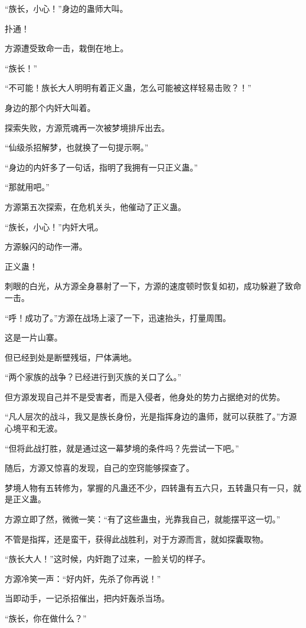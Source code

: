 \begin{this_body}
“族长，小心！”身边的蛊师大叫。

扑通！

方源遭受致命一击，栽倒在地上。

“族长！”

“不可能！族长大人明明有着正义蛊，怎么可能被这样轻易击败？！”

身边的那个内奸大叫着。

探索失败，方源荒魂再一次被梦境排斥出去。

“仙级杀招解梦，也就换了一句提示啊。”

“身边的内奸多了一句话，指明了我拥有一只正义蛊。”

“那就用吧。”

方源第五次探索，在危机关头，他催动了正义蛊。

“族长，小心！”内奸大吼。

方源躲闪的动作一滞。

正义蛊！

刺眼的白光，从方源全身暴射了一下，方源的速度顿时恢复如初，成功躲避了致命一击。

“呼！成功了。”方源在战场上滚了一下，迅速抬头，打量周围。

这是一片山寨。

但已经到处是断壁残垣，尸体满地。

“两个家族的战争？已经进行到灭族的关口了么。”

但方源发现自己并不是受害者，而是入侵者，他身处的势力占据绝对的优势。

“凡人层次的战斗，我又是族长身份，光是指挥身边的蛊师，就可以获胜了。”方源心境平和无波。

“但将此战打胜，就是通过这一幕梦境的条件吗？先尝试一下吧。”

随后，方源又惊喜的发现，自己的空窍能够探查了。

梦境人物有五转修为，掌握的凡蛊还不少，四转蛊有五六只，五转蛊只有一只，就是正义蛊。

方源立即了然，微微一笑：“有了这些蛊虫，光靠我自己，就能摆平这一切。”

不管是指挥，还是蛮干，获得此战胜利，对于方源而言，就如探囊取物。

“族长大人！”这时候，内奸跑了过来，一脸关切的样子。

方源冷笑一声：“好内奸，先杀了你再说！”

当即动手，一记杀招催出，把内奸轰杀当场。

“族长，你在做什么？”


\end{this_body}
